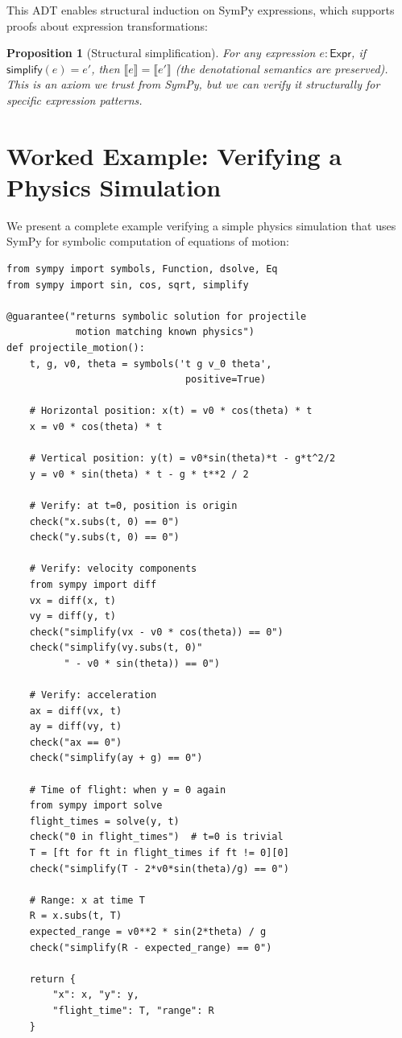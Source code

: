 \documentclass[11pt,a4paper]{report}
\theoremstyle{definition}
\theoremstyle{plain}
\newtheorem{proposition}[definition]{Proposition}
\newcommand{\den}[1]{\llbracket #1 \rrbracket}
\begin{document}
This ADT enables structural induction on SymPy expressions, which supports
proofs about expression transformations:

\begin{proposition}[Structural simplification]
For any expression $e : \mathsf{Expr}$, if $\mathsf{simplify}(e) = e'$,
then $\den{e} = \den{e'}$ (the denotational semantics are preserved).
This is an axiom we trust from SymPy, but we can verify it structurally for
specific expression patterns.
\end{proposition}

\section{Worked Example: Verifying a Physics Simulation}

We present a complete example verifying a simple physics simulation that
uses SymPy for symbolic computation of equations of motion:

\begin{lstlisting}[style=synhopy]
from sympy import symbols, Function, dsolve, Eq
from sympy import sin, cos, sqrt, simplify

@guarantee("returns symbolic solution for projectile
            motion matching known physics")
def projectile_motion():
    t, g, v0, theta = symbols('t g v_0 theta',
                               positive=True)

    # Horizontal position: x(t) = v0 * cos(theta) * t
    x = v0 * cos(theta) * t

    # Vertical position: y(t) = v0*sin(theta)*t - g*t^2/2
    y = v0 * sin(theta) * t - g * t**2 / 2

    # Verify: at t=0, position is origin
    check("x.subs(t, 0) == 0")
    check("y.subs(t, 0) == 0")

    # Verify: velocity components
    from sympy import diff
    vx = diff(x, t)
    vy = diff(y, t)
    check("simplify(vx - v0 * cos(theta)) == 0")
    check("simplify(vy.subs(t, 0)"
          " - v0 * sin(theta)) == 0")

    # Verify: acceleration
    ax = diff(vx, t)
    ay = diff(vy, t)
    check("ax == 0")
    check("simplify(ay + g) == 0")

    # Time of flight: when y = 0 again
    from sympy import solve
    flight_times = solve(y, t)
    check("0 in flight_times")  # t=0 is trivial
    T = [ft for ft in flight_times if ft != 0][0]
    check("simplify(T - 2*v0*sin(theta)/g) == 0")

    # Range: x at time T
    R = x.subs(t, T)
    expected_range = v0**2 * sin(2*theta) / g
    check("simplify(R - expected_range) == 0")

    return {
        "x": x, "y": y,
        "flight_time": T, "range": R
    }
\end{lstlisting}
\end{document}
